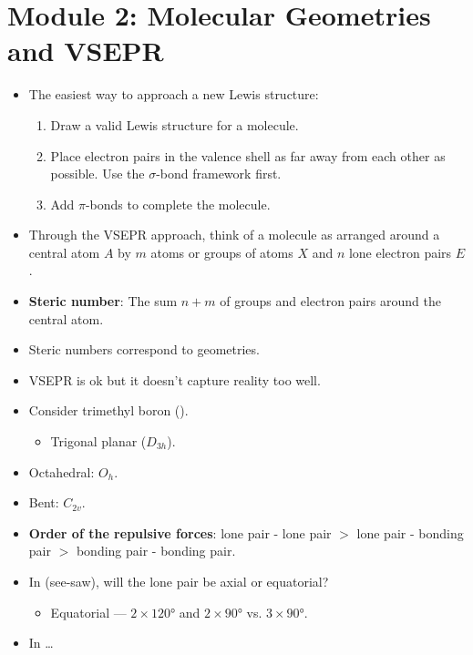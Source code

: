 \documentclass[../notes.tex]{subfiles}
\begin{document}
\section{Module 2: Molecular Geometries and VSEPR}
\begin{itemize}
    \item The easiest way to approach a new Lewis structure:
    \begin{enumerate}
        \item Draw a valid Lewis structure for a molecule.
        \item Place electron pairs in the valence shell as far away from each other as possible. Use the $\sigma$-bond framework first.
        \item Add $\pi$-bonds to complete the molecule.
    \end{enumerate}
    \item Through the VSEPR approach, think of a molecule as arranged around a central atom $A$ by $m$ atoms or groups of atoms $X$ and $n$ lone electron pairs $E$.
    \item \textbf{Steric number}: The sum $n+m$ of groups and electron pairs around the central atom.
    \item Steric numbers correspond to geometries.
    \item VSEPR is ok but it doesn't capture reality too well.
    \item Consider trimethyl boron ().
    \begin{itemize}
        \item Trigonal planar ($D_{3h}$).
    \end{itemize}
    \item Octahedral: $O_h$.
    \item Bent: $C_{2v}$.
    \item \textbf{Order of the repulsive forces}: lone pair - lone pair $>$ lone pair - bonding pair $>$ bonding pair - bonding pair.
    \item In  (see-saw), will the lone pair be axial or equatorial?
    \begin{itemize}
        \item Equatorial --- $2\times\ang{120}$ and $2\times\ang{90}$ vs. $3\times\ang{90}$.
    \end{itemize}
    \item In \dots
    \begin{figure}[h!]
        \centering
        \begin{subfigure}[b]{0.2\linewidth}

\end{subfigure}
\end{figure}
\end{itemize}
\end{document}
